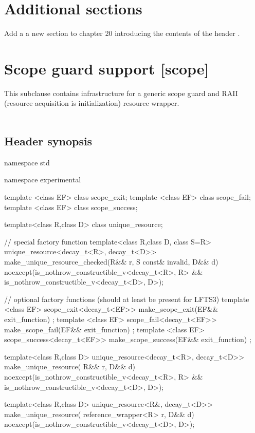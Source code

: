\documentclass[ebook,11pt,article]{memoir}
\begin{document}
\section{Additional sections}
Add a a new section to chapter 20 introducing the contents of the header .

\section{Scope guard support [scope]}
This subclause contains infrastructure for a generic scope guard and RAII (resource acquisition is initialization) resource wrapper.\\
\\
\subsection{Header  synopsis}


\begin{codeblock}
namespace std {
namespace experimental {
template <class EF>
class scope_exit;
template <class EF>
class scope_fail;
template <class EF>
class scope_success;


template<class R,class D>
class unique_resource;

// special factory function
template<class R,class D, class S=R>
unique_resource<decay_t<R>, decay_t<D>>
make_unique_resource_checked(R&& r, S const& invalid, D&& d)
noexcept(is_nothrow_constructible_v<decay_t<R>, R> &&
         is_nothrow_constructible_v<decay_t<D>, D>);

// optional factory functions (should at least be present for LFTS3)
template <class EF>
scope_exit<decay_t<EF>> make_scope_exit(EF&& exit_function) ;
template <class EF>
scope_fail<decay_t<EF>> make_scope_fail(EF&& exit_function) ;
template <class EF>
scope_success<decay_t<EF>> make_scope_success(EF&& exit_function) ;

template<class R,class D>
unique_resource<decay_t<R>, decay_t<D>>
make_unique_resource( R&&  r, D&& d) 
noexcept(is_nothrow_constructible_v<decay_t<R>, R> &&
         is_nothrow_constructible_v<decay_t<D>, D>);

template<class R,class D>
unique_resource<R&, decay_t<D>>
make_unique_resource( reference_wrapper<R>  r, D&& d) 
noexcept(is_nothrow_constructible_v<decay_t<D>, D>);

}}
\end{codeblock}
\end{document}
